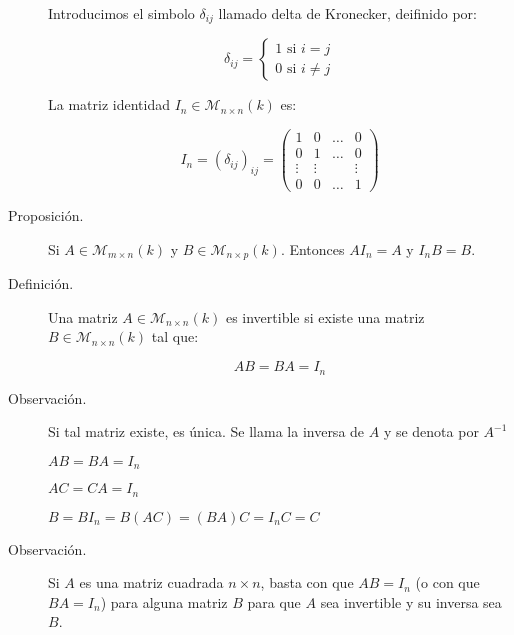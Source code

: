 \documentclass[12pt]{article}
\begin{document}
\begin{description}
Introducimos el simbolo $ \delta_{ij} $ llamado delta de Kronecker, deifinido por:

\begin{equation}
\delta_{ij} = \left\{
\begin{array}{l}
1 \text{ si } i = j \\
0 \text{ si } i \ne j
\end{array}
\right.
\end{equation}

La matriz identidad $ I_n \in \mathcal{M}_{n \times n}(k)$ es:

\begin{equation}
I_n = (\delta_{ij})_{ij} =
\begin{pmatrix}
1 & 0 & \dots & 0 \\
0 & 1 & \dots & 0 \\
\vdots & \vdots &   & \vdots \\
0 & 0 & \dots & 1
\end{pmatrix}
\end{equation}

\item [Proposición.] Si $ A \in \mathcal{M}_{m \times n}(k)$ y $B \in \mathcal{M}_{n \times p}(k)$. Entonces $A I_n = A$ y $I_n B = B$.

\item [Definición.] Una matriz $A \in \mathcal{M}_{n \times n}(k)$ es invertible si existe una matriz $B \in \mathcal{M}_{n \times n}(k)$ tal que:

\begin{equation}
A B = B A = I_n
\end{equation}

\item [Observación.] Si tal matriz existe, es única. Se llama la inversa de $A$ y se denota por $A^{-1}$

\begin{math}
A B = B A = I_n
\end{math}

\begin{math}
A C = C A = I_n
\end{math}

\begin{math}
B = B I_n = B (A C) = (B A) C = I_n C = C
\end{math}

\item [Observación.] Si $A$ es una matriz cuadrada $n \times n$, basta con que $A B = I_n$ (o con que $B A = I_n$) para alguna matriz $B$ para que $A$ sea invertible y su inversa sea $B$.


\end{description}
\end{document}
